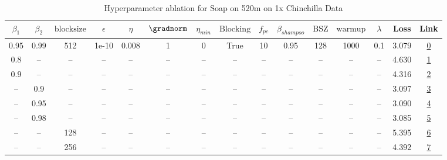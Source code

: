 \begin{table}[H]
\centering
\caption{Hyperparameter ablation for Soap on 520m on 1x Chinchilla Data}
\label{tab:ablation_soap_520m_on_1x_chinchilla_data}
\begin{tabular}{ccccccccccccccc}
\toprule
$\beta_1$ & $\beta_2$ & $\mathrm{block size}$ & $\epsilon$ & $\eta$ & $\gradnorm$ & $\eta_{min}$ & $\mathrm{Blocking}$ & $f_{pc}$ & $\beta_{shampoo}$ & $\mathrm{BSZ}$ & $\mathrm{warmup}$ & $\lambda$ & Loss & Link \\
\midrule
0.95 & 0.99 & 512 & 1e-10 & 0.008 & 1 & 0 & True & 10 & 0.95 & 128 & 1000 & 0.1 & 3.079 & \href{https://wandb.ai/stanford-mercury/optimizer-scaling/runs/sweep-520m-10B-soape9baa74lr0.008-wd0.1-minlr0-warmup1000-b10.95-8d30a7}{0} \\
\midrule
0.8 & -- & -- & -- & -- & -- & -- & -- & -- & -- & -- & -- & -- & 4.630 & \href{https://wandb.ai/stanford-mercury/optimizer-scaling/runs/sweep-520m-10B-soapere54bb4blr0.008-wd0.1-minlr0-warmup1000-b10.-11ddc5}{1} \\
0.9 & -- & -- & -- & -- & -- & -- & -- & -- & -- & -- & -- & -- & 4.316 & \href{https://wandb.ai/stanford-mercury/optimizer-scaling/runs/sweep-520m-10B-soapeb38cf8lr0.008-wd0.1-minlr0-warmup1000-b10.9--fcc21b}{2} \\
-- & 0.9 & -- & -- & -- & -- & -- & -- & -- & -- & -- & -- & -- & 3.097 & \href{https://wandb.ai/stanford-mercury/optimizer-scaling/runs/sweep-520m-10B-soapere54bd5flr0.008-wd0.1-minlr0-warmup1000-b10.-4d6d54}{3} \\
-- & 0.95 & -- & -- & -- & -- & -- & -- & -- & -- & -- & -- & -- & 3.090 & \href{https://wandb.ai/stanford-mercury/optimizer-scaling/runs/sweep-520m-10B-soapere42c49clr0.008-wd0.1-minlr0-warmup1000-b10.-842d20}{4} \\
-- & 0.98 & -- & -- & -- & -- & -- & -- & -- & -- & -- & -- & -- & 3.085 & \href{https://wandb.ai/stanford-mercury/optimizer-scaling/runs/sweep-520m-10B-soapere2ba10alr0.008-wd0.1-minlr0-warmup1000-b10.-db6073}{5} \\
-- & -- & 128 & -- & -- & -- & -- & -- & -- & -- & -- & -- & -- & 5.395 & \href{https://wandb.ai/stanford-mercury/optimizer-scaling/runs/sweep-520m-10B-soaperef56540lr0.008-wd0.1-minlr0-warmup1000-b10.-996e37}{6} \\
-- & -- & 256 & -- & -- & -- & -- & -- & -- & -- & -- & -- & -- & 4.392 & \href{https://wandb.ai/stanford-mercury/optimizer-scaling/runs/sweep-520m-10B-soapere3d9681lr0.008-wd0.1-minlr0-warmup1000-b10.-0caed5}{7} \\

\end{tabular}
\end{table}
